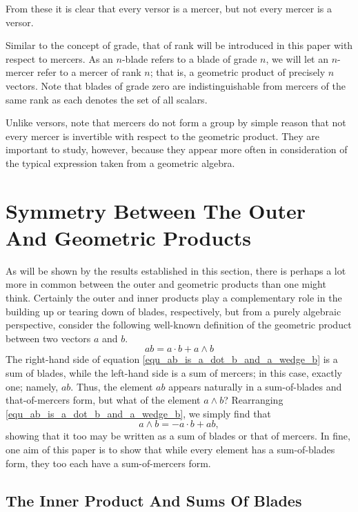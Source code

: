 \documentclass{birkjour}
\theoremstyle{definition}
\theoremstyle{remark}
\numberwithin{equation}{section}
\begin{document}
From these it is clear that every versor is a mercer, but not every mercer is a versor.

Similar to the concept of grade, that of rank will be introduced in this paper with respect to mercers.  As an $n$-blade
refers to a blade of grade $n$, we will let an $n$-mercer refer to a mercer of rank $n$; that is, a geometric
product of precisely $n$ vectors.  Note that blades of grade zero
are indistinguishable from mercers of the same rank as each denotes the set of all scalars.

Unlike versors, note that mercers do not form a group by simple reason that not every
mercer is invertible with respect to the geometric product.  They are important to study, however,
because they appear more often in consideration of the typical expression taken from a geometric algebra.

\section{Symmetry Between The Outer And Geometric Products}

As will be shown by the results established in this section, there is perhaps a lot more in
common between the outer and geometric products than one might think.  Certainly the outer and
inner products play a complementary role in the building up or tearing down of blades, respectively, but from a
purely algebraic perspective, consider the following well-known definition of the geometric product
between two vectors $a$ and $b$.
\begin{equation}\label{equ_ab_is_a_dot_b_and_a_wedge_b}
ab = a\cdot b + a\wedge b
\end{equation}
The right-hand side of equation \eqref{equ_ab_is_a_dot_b_and_a_wedge_b} is a sum of blades, while the left-hand side is a sum of mercers;
in this case, exactly one; namely, $ab$.  Thus, the element $ab$ appears naturally in a sum-of-blades and
that-of-mercers form, but what of the element $a\wedge b$?  Rearranging \eqref{equ_ab_is_a_dot_b_and_a_wedge_b}, we simply find that
\begin{equation}
a\wedge b = -a\cdot b + ab,
\end{equation}
showing that it too may be written as a sum of blades or that of mercers.  In fine, one aim of this paper
is to show that while every element has a sum-of-blades form, they too each have a sum-of-mercers form.

\subsection{The Inner Product And Sums Of Blades}
\end{document}

